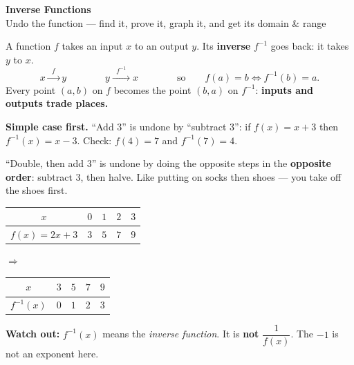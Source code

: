 \documentclass[11pt,letterpaper]{article}
\newif\ifkey
\newcommand{\finv}{f^{-1}}
\begin{document}
\begin{center}
{\color{FangBlue}\Huge\bfseries Inverse Functions}\\[2pt]
{\large Undo the function — find it, prove it, graph it, and get its domain \& range}
\ifkey\\[3pt]{\color{FangRed}\large\bfseries Answer Key with complete solutions}\fi
\end{center}
\vspace{-4pt}

\begin{idea}
A function $f$ takes an input $x$ to an output $y$. Its \textbf{inverse} $\finv$ goes back: it takes $y$ to $x$.
\[ x \xrightarrow{\;\;f\;\;} y \qquad\qquad y \xrightarrow{\;\;\finv\;\;} x \qquad\qquad\text{so}\qquad f(a)=b \iff \finv(b)=a. \]
Every point $(a,b)$ on $f$ becomes the point $(b,a)$ on $\finv$: \textbf{inputs and outputs trade places.}
\end{idea}

\begin{simple}
\textbf{Simple case first.} ``Add $3$'' is undone by ``subtract $3$'': if $f(x)=x+3$ then $\finv(x)=x-3$. Check: $f(4)=7$ and $\finv(7)=4$.\par
``Double, then add $3$'' is undone by doing the opposite steps in the \textbf{opposite order}: subtract $3$, then halve. Like putting on socks then shoes — you take off the shoes first.
\end{simple}

\begin{center}
\begin{tabular}{c|cccc}
\toprule
$x$ & $0$ & $1$ & $2$ & $3$\\ \midrule
$f(x)=2x+3$ & $3$ & $5$ & $7$ & $9$\\
\bottomrule
\end{tabular}
\qquad$\Longrightarrow$\qquad
\begin{tabular}{c|cccc}
\toprule
$x$ & $3$ & $5$ & $7$ & $9$\\ \midrule
$\finv(x)$ & $0$ & $1$ & $2$ & $3$\\
\bottomrule
\end{tabular}
\end{center}

\begin{warn}
\textbf{Watch out:} $\finv(x)$ means the \emph{inverse function}. It is \textbf{not} $\dfrac{1}{f(x)}$. The $-1$ is not an exponent here.
\end{warn}
\end{document}
